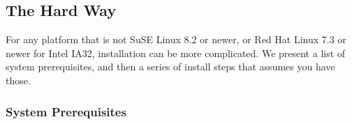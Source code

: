 \newcommand{\gccURL}{ftp://ftp.gnu.org/gnu/gcc}
\newcommand{\glibcURL}{ftp://ftp.gnu.org/gnu/glibc}
\newcommand{\makeURL}{ftp://ftp.gnu.org/gnu/make}
\newcommand{\bashURL}{ftp://ftp.gnu.org/gnu/bash}
\newcommand{\bisonURL}{ftp://ftp.gnu.org/gnu/bison}
\newcommand{\tarURL}{ftp://ftp.gnu.org/gnu/tar}
\newcommand{\autoconfURL}{ftp://ftp.gnu.org/gnu/autoconf}
\newcommand{\automakeURL}{ftp://ftp.gnu.org/gnu/automake}
\newcommand{\wgetURL}{ftp://ftp.gnu.org/gnu/wget}
\newcommand{\cvsURL}{http://www.cvshome.org}
\newcommand{\linuxPPCJDKURL}{http://www.ibm.com/java/jdk/linux/index.html}
\newcommand{\linuxKernelURL}{http://www.kernel.org}

\subsection{The Hard Way}

 For any platform that is not SuSE\Rweb{} Linux\Rweb{} 8.2 or newer, or Red Hat\TMweb{} Linux 7.3 or newer for Intel\Rweb{}
IA32, installation can be more complicated.  We present a list of system
prerequisites, and then a series of install steps that assumes you
have those.

\subsubsection{System Prerequisites}

